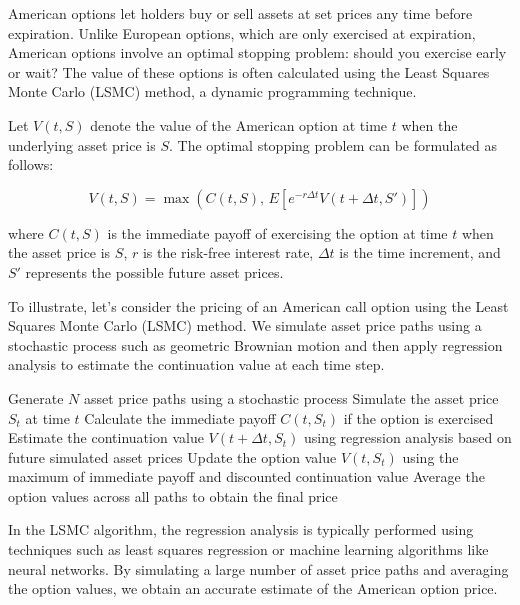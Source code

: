 \documentclass[12pt]{book} %
\begin{document}
American options let holders buy or sell assets at set prices any time before expiration. Unlike European options, which are only exercised at expiration, American options involve an optimal stopping problem: should you exercise early or wait? The value of these options is often calculated using the Least Squares Monte Carlo (LSMC) method, a dynamic programming technique.

Let \(V(t, S)\) denote the value of the American option at time \(t\) when the underlying asset price is \(S\). The optimal stopping problem can be formulated as follows:

\[
V(t, S) = \max \left( C(t, S), \, E \left[ e^{-r\Delta t}V(t + \Delta t, S') \right] \right)
\]

where \(C(t, S)\) is the immediate payoff of exercising the option at time \(t\) when the asset price is \(S\), \(r\) is the risk-free interest rate, \(\Delta t\) is the time increment, and \(S'\) represents the possible future asset prices.

To illustrate, let's consider the pricing of an American call option using the Least Squares Monte Carlo (LSMC) method. We simulate asset price paths using a stochastic process such as geometric Brownian motion and then apply regression analysis to estimate the continuation value at each time step.

\FloatBarrier
\begin{algorithm}
\caption{Least Squares Monte Carlo (LSMC) for American Call Option Pricing}
\begin{algorithmic}[1]
\State Generate \(N\) asset price paths using a stochastic process
        \State Simulate the asset price \(S_t\) at time \(t\)
        \State Calculate the immediate payoff \(C(t, S_t)\) if the option is exercised
        \State Estimate the continuation value \(V(t + \Delta t, S_t)\) using regression analysis based on future simulated asset prices
        \State Update the option value \(V(t, S_t)\) using the maximum of immediate payoff and discounted continuation value
    \EndFor
\EndFor
\State Average the option values across all paths to obtain the final price
\end{algorithmic}
\end{algorithm}
\FloatBarrier

In the LSMC algorithm, the regression analysis is typically performed using techniques such as least squares regression or machine learning algorithms like neural networks. By simulating a large number of asset price paths and averaging the option values, we obtain an accurate estimate of the American option price.
\end{document}
